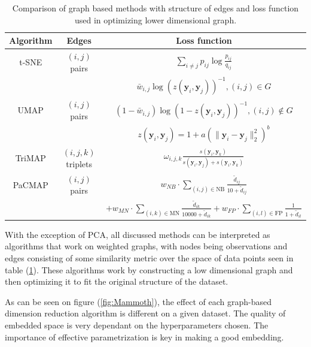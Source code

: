 \begin{table}[htb]
	\begin{center}
		\begin{tabular}{|c|c|c|}
			\hline
			Algorithm & Edges & Loss function \\
			\hline
			t-SNE & $(i, j)$ pairs & $\sum_{i\neq j} p_{ij} \log{\frac{p_{ij}}{q_{ij}}}$ \\
			\hline
			&& 
			$\bar{w}_{i,j}\log \left( z(\mathbf{y}_i, \mathbf{y}_j) \right)^{-1}, (i,j) \in G$  \\
			UMAP& $(i, j)$ pairs & $\left(1-\bar{w}_{i,j}\right)\log \left( 1 - z(\mathbf{y}_i, \mathbf{y}_j) \right)^{-1}, (i,j) \notin G$ \\
			&& $z(\mathbf{y}_i, \mathbf{y}_j) = 1+a\left(\|\mathbf{y}_i-\mathbf{y}_j\|_2^{2}\right)^b $ \\
			\hline
			TriMAP & $(i, j, k)$ triplets & 
			$\omega_{i,j,k}\frac{s(\mathbf{y}_i,\mathbf{y}_k)}{s(\mathbf{y}_i,\mathbf{y}_j)+s(\mathbf{y}_i,\mathbf{y}_k)}$ \\
			\hline
			PaCMAP & $(i, j)$ pairs & 
			$w_{NB}\cdot\sum_{(i,j) \in \textrm{NB}}\frac{\tilde{d}_{ij}}{10 + \tilde{d}_{ij}}$ \\
			&& $+ w_{MN}\cdot\sum_{(i,k) \in \text{MN}}\frac{\tilde{d}_{ik}}{10000 + \tilde{d}_{ik}}+ w_{FP}\cdot\sum_{(i,l) \in \text{FP}}\frac{1}{1 + \tilde{d}_{il}}$ \\
			\hline
		\end{tabular}
		\caption{Comparison of graph based methods with structure of edges and loss function used in optimizing lower dimensional graph.}
		\label{tab:graph}
	\end{center}
\end{table}

With the exception of PCA, all discussed methods can be interpreted as algorithms that work on weighted graphs, with nodes being observations and edges consisting of some similarity metric over the space of data points seen in table (\ref{tab:graph}). These algorithms work by constructing a low dimensional graph and then optimizing it to fit the original structure of the dataset.

As can be seen on figure (\ref{fig:Mammoth}), the effect of each graph-based dimension reduction algorithm is different on a given dataset. The quality of embedded space is very dependant on the hyperparameters chosen. The importance of effective parametrization is key in making a good embedding. 


